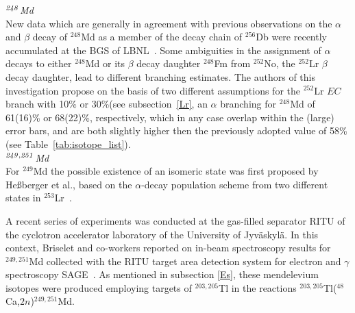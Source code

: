 {\it $^{\it248}$Md}\\
New data which are generally in agreement with previous observations on the $\alpha$ and $\beta$ decay of $^{248}$Md as a member of the decay chain of $^{256}$Db were recently accumulated at the BGS of LBNL~\cite{Pore2024}.
Some ambiguities in the assignment of $\alpha$ decays to either $^{248}$Md or its $\beta$ decay daughter $^{248}$Fm from $^{252}$No, the $^{252}$Lr $\beta$ decay daughter, lead to different branching estimates.
The authors of this investigation propose on the basis of two different assumptions for the $^{252}$Lr $EC$ branch with 10\% or 30\%(see subsection~\ref{Lr}, an $\alpha$ branching for $^{248}$Md of 61(16)\% or 68(22)\%, respectively, which in any case overlap within the (large) error bars, and are both slightly higher then the previously adopted value of 58\% (see Table~\ref{tab:isotope_list}).\\

{\it $^{\it249,251}$Md}\\
For $^{249}$Md the possible existence of an isomeric state was first proposed by He{\ss}berger et al., based on the $\alpha$-decay population scheme from two different states in $^{253}$Lr~\cite{Hessberger2001}. 

A recent series of experiments was conducted at the gas-filled separator RITU of the cyclotron accelerator laboratory of the University of Jyv\"{a}skyl\"{a}. 
In this context, Briselet and co-workers reported on in-beam spectroscopy results for $^{249,251}$Md collected with the RITU target area detection system for electron and $\gamma$ spectroscopy SAGE~\cite{Briselet2019,Briselet2020}.
As mentioned in subsection \ref{Es}, these mendelevium isotopes were produced employing targets of $^{203,205}$Tl in the reactions $^{203,205}$Tl($^{48}$Ca,$2n$)$^{249,251}$Md.

